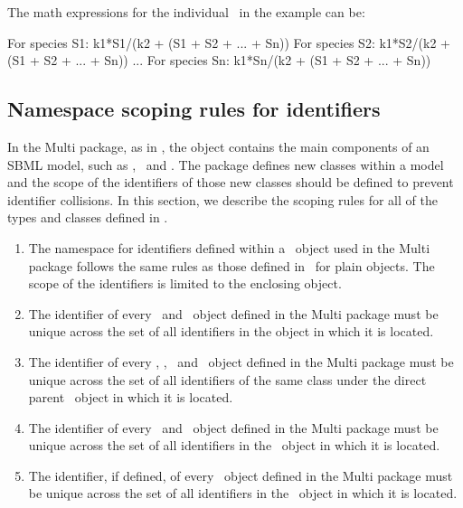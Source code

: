 The math expressions for the individual \species\ in the example can be:

\begin{example}[style=latex]
For species S1:    k1*S1/(k2 + (S1 + S2 + ... + Sn)) 
For species S2:    k1*S2/(k2 + (S1 + S2 + ... + Sn)) 
...
For species Sn:    k1*Sn/(k2 + (S1 + S2 + ... + Sn)) 
\end{example}

\clearpage


\subsection{Namespace scoping rules for identifiers}
\label{def:namespaces_scoping_rules}

In the Multi package, as in \SbmlLevelThreeVersionOneCore,
the \Model object contains the main components of an
SBML model, such as \species, \compartments\ and \reactions.  The
package defines new classes within a model and the scope of the identifiers of 
those new classes should be defined to prevent identifier collisions. In this section, we
describe the scoping rules for all of the types and classes defined in
.

\begin{enumerate}

\item The namespace for  identifiers defined within 
  a \ExModel\ object used in the Multi package follows the
  same rules as those defined in \SbmlLevelThreeVersionOneCore\ for plain \Model
  objects. The scope of the identifiers is limited to the enclosing
  \ExModel object.  
  
\item The identifier of every \SpeciesType\ and \PossibleSpeciesFeatureValue\ object defined in the Multi package must be unique
  across the set of all identifiers in the  object in which it is located. 

\item The identifier of every \SpeciesTypeInstance, \SpeciesTypeComponentIndex,
  \InSpeciesTypeBond\ and \SpeciesFeatureType\ object defined in the Multi package must be unique
  across the set of all identifiers of the same class under the direct parent \SpeciesType\ object in which it is located. 

\item The identifier of every \SpeciesFeature\ and \SubListOfSpeciesFeatures\ object defined in the Multi package must be unique
  across the set of all identifiers in the \ExSpecies\ object in which it is located. 
  
\item The identifier, if defined, of every \CompartmentReference\ object defined in the Multi package must be unique
  across the set of all identifiers in the \ExCompartment\ object in which it is located. 

\end{enumerate}




